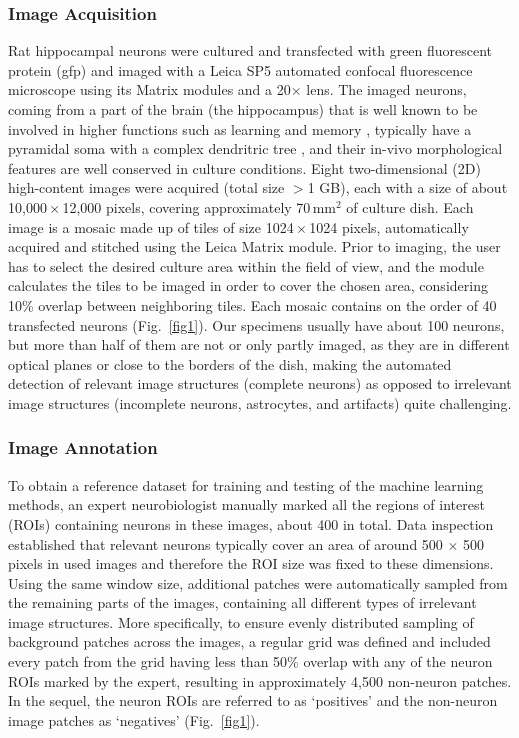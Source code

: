 \subsubsection{Image Acquisition}
\label{sec:acquisition}
Rat hippocampal neurons were cultured and transfected with green fluorescent protein (\gls{gfp}) and imaged with a Leica SP5 automated confocal fluorescence microscope using its Matrix modules and a 20$\times$ lens. The imaged neurons, coming from a part of the brain (the hippocampus) that is well known to be involved in higher functions such as learning and memory \cite{squire1992memory}, typically have a pyramidal soma with a complex dendritric tree \cite{goslin1998rat}, and their in-vivo morphological features are well conserved in culture conditions. Eight two-dimensional (2D) high-content images were acquired (total size $>$1 GB), each with a size of about 10,000\,$\times$\,12,000 pixels, covering approximately 70\,mm${}^2$ of culture dish. Each image is a mosaic made up of tiles of size 1024\,$\times$\,1024 pixels, automatically acquired and stitched using the Leica Matrix module. Prior to imaging, the user has to select the desired culture area within the field of view, and the module calculates the tiles to be imaged in order to cover the chosen area, considering 10\% overlap between neighboring tiles. Each mosaic contains on the order of 40 transfected neurons (Fig.\ \ref{fig1}). Our specimens usually have about 100 neurons, but more than half of them are not or only partly imaged, as they are in different optical planes or close to the borders of the dish, making the automated detection of relevant image structures (complete neurons) as opposed to irrelevant image structures (incomplete neurons, astrocytes, and artifacts) quite challenging.

\subsubsection{Image Annotation}
\label{sec:annotation}

To obtain a reference dataset for training and testing of the machine learning methods, an expert neurobiologist manually marked all the regions of interest (ROIs) containing neurons in these images, about 400 in total. Data inspection established that relevant neurons typically cover an area of around 500 $\times$ 500 pixels in used images and therefore the ROI size was fixed to these dimensions. Using the same window size, additional patches were automatically sampled from the remaining parts of the images, containing all different types of irrelevant image structures. More specifically, to ensure evenly distributed sampling of background patches across the images, a regular grid was defined and included every patch from the grid having less than 50\% overlap with any of the neuron ROIs marked by the expert, resulting in approximately 4,500 non-neuron patches. In the sequel, the neuron ROIs are referred to as `positives' and the non-neuron image patches as `negatives' (Fig.~\ref{fig1}).

